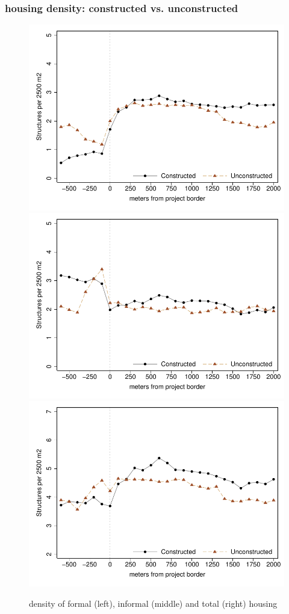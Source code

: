 \documentclass[aspectratio=32]{beamer}
\begin{document}

\begin{frame}
\frametitle{housing density: constructed vs. unconstructed}
{ \footnotesize
\begin{center}
\vspace{2mm}
\begin{figure}
\includegraphics[width=.29\textwidth,trim={1cm 1cm 1cm 1cm}]{figures/bblu/bblu_for_pre_means}\hfill
\includegraphics[width=.29\textwidth,trim={1cm 1cm 1cm 1cm}]{figures/bblu/bblu_inf_pre_means}\hfill
\includegraphics[width=.29\textwidth,trim={1cm 1cm 1cm 1cm}]{figures/bblu/bblu_total_buildings_pre_means}
\caption{\scriptsize density of formal (left), informal (middle) and total (right) housing}
\end{figure}
\end{center}
}
\end{frame}
\end{document}
